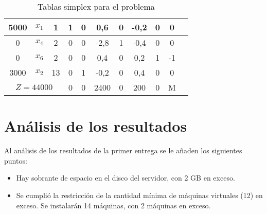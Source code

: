 \documentclass[a4paper,11pt]{article}
\begin{document}
\begin{table}[h!]
\begin{tabular}{ | c | c | c || c | c | c | c | c | c | c || c | }
  5000                                                    & \(x_1\) & 1  & 1 & 0 & 0,6  & 0 & -0,2 & 0 & 0  & \\ \hline
                                                        0 & \(x_4\) & 2  & 0 & 0 & -2,8 & 1 & -0,4 & 0 & 0  & \\ \hline
                                                        0 & \(x_6\) & 2  & 0 & 0 & 0,4  & 0 & 0,2  & 1 & -1 & \\ \hline
                                                     3000 & \(x_2\) & 13 & 0 & 1 & -0,2 & 0 & 0,4  & 0 & 0  & \\ \hline \hline
                     \multicolumn{3}{|c|}{ \(Z = 44000\)} & 0 & 0 & 2400 & 0 & 200 & 0 & M & \\ \hline

\end{tabular}
\caption{Tablas simplex para el problema}\label{tab:simplex}
\end{table}

\FloatBarrier

\section{Análisis de los resultados}

Al análisis de los resultados de la primer entrega se le añaden los siguientes
puntos:

\begin{itemize}

  \item Hay sobrante de espacio en el disco del servidor, con 2 GB en exceso.

  \item Se cumplió la restricción de la cantidad mínima de máquinas virtuales
    (12) en exceso. Se instalarán 14 máquinas, con 2 máquinas en exceso.

\end{itemize}
\end{document}
